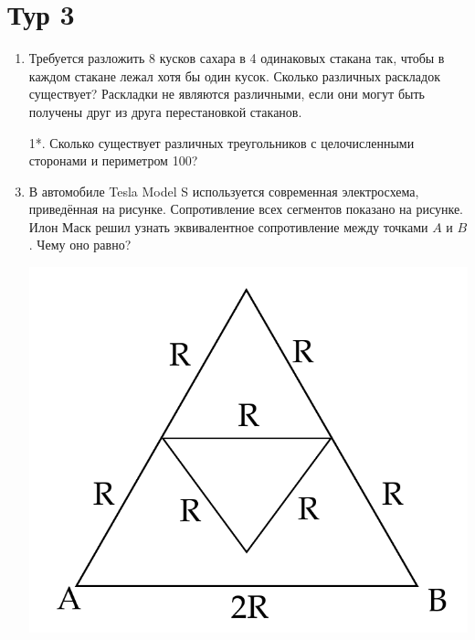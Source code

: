 \documentclass[12pt]{article} %
\begin{document}
\section*{Тур 3}


\begin{enumerate}
\item Требуется разложить 8 кусков сахара в 4 одинаковых стакана так, чтобы в каждом стакане лежал хотя бы один кусок. 
Сколько различных раскладок существует? Раскладки не являются различными, 
если они могут быть получены друг из друга перестановкой стаканов.

\item[1*.] Сколько существует различных треугольников с целочисленными сторонами и периметром 100?


\item 
\begin{minipage}{\linewidth}
        \centering
        \begin{minipage}{0.65\linewidth}
                В автомобиле Tesla Model S используется современная электросхема, приведённая на рисунке. 
                Сопротивление всех сегментов показано на рисунке. Илон Маск решил узнать эквивалентное сопротивление между точками $A$ и $B$. 
                Чему оно равно?
        \end{minipage}
        \hspace{0.05\linewidth}
        \begin{minipage}{0.25\linewidth}
            \includegraphics[scale=0.4]{drawing-1.pdf}
        \end{minipage}
    \end{minipage} 


\end{enumerate}
\end{document}
